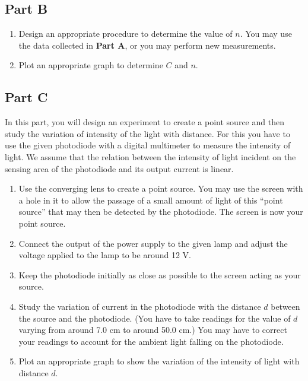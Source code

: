 \begin{refsection}
\subsection*{Part B}

\begin{enumerate}
    \item Design an appropriate procedure to determine the value of $n$. You may use the  data collected in \textbf{Part A}, or you may perform new measurements.
    
    \item Plot an appropriate graph to determine $C$ and $n$.
\end{enumerate}


\subsection*{Part C}

In this part, you will design an experiment to create a point source and then study the variation of intensity of the light with distance.  For this you have to use the given photodiode with a digital multimeter to measure the intensity of light. We assume that the relation between the intensity of light incident on the sensing area of the photodiode and its output current is linear. 

\begin{enumerate}
    \item Use the converging lens to create a point source. You may use the screen with a hole in it to allow the passage of a small amount of light of this ``point source'' that may then be detected by the photodiode. The screen is now your point source. 
    
    \item Connect the output of the power supply to the given lamp and adjust the voltage applied to the lamp to be around 12 V. 
    
    \item Keep the photodiode initially as close as possible to the screen acting as your source. 
    
    \item Study the variation of current in the photodiode with the distance $d$ between the source and the photodiode. (You have to take readings for the value of $d$ varying from around 7.0 cm to around 50.0 cm.) You may have to correct your readings to account for the ambient light falling on the photodiode. 
    \item Plot an appropriate graph to show the variation of the intensity of light with distance $d$.
    

\end{enumerate}
\end{refsection}
